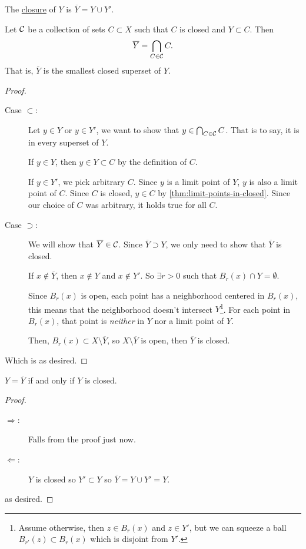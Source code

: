 \begin{definition}[Closure]
    The \ul{closure} of $Y$ is $\overline{Y} = Y\cup Y'$.
\end{definition}

\begin{theorem}
    Let $\mathcal C$ be a collection of sets $C\subset X$ such that $C$ is closed and $Y\subset C$. Then
    \[\overline{Y} = \bigcap_{C\in\mathcal C}C.\]
    That is, $\overline{Y}$ is the smallest closed superset of $Y$.
\end{theorem}
\begin{proof}
    ~\begin{description}
        \item[Case $\subset$:] Let $y\in Y$ or $y\in Y'$, we want to show that $y\in \bigcap_{C\in\mathcal C}C$. That is to say, it is in every superset of $Y$.

            If $y\in Y$, then $y\in Y\subset C$ by the definition of $C$.

            If $y\in Y'$, we pick arbitrary $C$. Since $y$ is a limit point of $Y$, $y$ is also a limit point of $C$. Since $C$ is closed, $y\in C$ by \cref{thm:limit-points-in-closed}. Since our choice of $C$ was arbitrary, it holds true for all $C$.

        \item[Case $\supset$:] We will show that $\overline{Y}\in \mathcal C$. Since $\overline{Y}\supset Y$, we only need to show that $\overline{Y}$ is closed.

            If $x\not\in \overline{Y}$, then $x\not\in Y$ and $x\not\in Y'$. So $\exists r > 0$ such that $B_r(x)\cap Y = \emptyset$.

            Since $B_r(x)$ is open, each point has a neighborhood centered in $B_r(x)$, this means that the neighborhood doesn't intersect $Y$\footnote{Assume otherwise, then $z\in B_r(x)$ and $z\in Y'$, but we can squeeze a ball $B_{r'}(z)\subset B_r(x)$ which is disjoint from $Y'$.}. For each point in $B_r(x)$, that point is \emph{neither} in $Y$ nor a limit point of $Y$.

            Then, $B_r(x)\subset X\setminus \overline{Y}$, so $X\setminus \overline{Y}$ is open, then $\overline{Y}$ is closed.
    \end{description}
    Which is as desired.
\end{proof}

\begin{corollary}
    $Y = \overline{Y}$ if and only if $Y$ is closed.
\end{corollary}
\begin{proof}
    ~\begin{description}
        \item[$\Longrightarrow$:] Falls from the proof just now.
        \item[$\Longleftarrow$:] $Y$ is closed so $Y'\subset Y$ so $\overline{Y} = Y\cup Y' = Y$.
    \end{description}
    as desired.
\end{proof}

